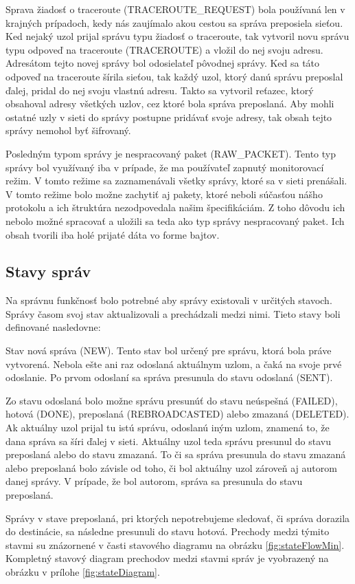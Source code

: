 \documentclass[slovak,master]{diploma}
\begin{document}
Sprava žiadosť o traceroute (TRACEROUTE\_REQUEST) bola používaná len v krajných prípadoch, kedy nás zaujímalo akou cestou sa správa preposiela sieťou. 
Ked nejaký uzol prijal správu typu žiadosť o traceroute, tak vytvoril novu správu typu odpoveď na traceroute (TRACEROUTE) a vložil do nej svoju adresu. 
Adresátom tejto novej správy bol odosielateľ pôvodnej správy. Ked sa táto odpoveď na traceroute šírila sieťou, 
tak každý uzol, ktorý danú správu preposlal ďalej, pridal do nej svoju vlastnú adresu.
Takto sa vytvoril reťazec, ktorý obsahoval adresy všetkých uzlov, cez ktoré bola správa preposlaná.
Aby mohli ostatné uzly v sieti do správy postupne pridávať svoje adresy, tak obsah tejto správy nemohol byť šifrovaný.

Posledným typom správy je nespracovaný paket (RAW\_PACKET). Tento typ správy bol využívaný iba v prípade, že ma používateľ zapnutý monitorovací režim.
V tomto režime sa zaznamenávali všetky správy, ktoré sa v sieti prenášali. V tomto režime bolo možne zachytiť aj pakety, 
ktoré neboli súčasťou nášho protokolu a ich štruktúra nezodpovedala našim špecifikáciám. Z toho dôvodu ich nebolo možné spracovať a 
uložili sa teda ako typ správy nespracovaný paket. Ich obsah tvorili iba holé prijaté dáta vo forme bajtov.

\subsection{Stavy správ}
Na správnu funkčnosť bolo potrebné aby správy existovali v určitých stavoch. Správy časom svoj stav aktualizovali a prechádzali medzi nimi. 
Tieto stavy boli definované nasledovne:

Stav nová správa (NEW). Tento stav bol určený pre správu, ktorá bola práve vytvorená. Nebola ešte ani raz odoslaná aktuálnym uzlom, a čaká na svoje 
prvé odoslanie. Po prvom odoslaní sa správa presunula do stavu odoslaná (SENT).

Zo stavu odoslaná bolo možne správu presunúť do stavu neúspešná (FAILED), hotová (DONE), preposlaná (REBROADCASTED) alebo zmazaná (DELETED). 
Ak aktuálny uzol prijal tu istú správu, odoslanú iným uzlom, znamená to, že dana správa sa šíri ďalej v sieti. Aktuálny uzol teda správu 
presunul do stavu preposlaná alebo do stavu zmazaná. 
To či sa správa presunula do stavu zmazaná alebo preposlaná bolo závisle od toho, či bol aktuálny uzol zároveň aj autorom danej správy. V prípade, že bol autorom, 
správa sa presunula do stavu preposlaná.

Správy v stave preposlaná, pri ktorých nepotrebujeme sledovať, či správa dorazila do destinácie, sa následne presunuli do stavu hotová. Prechody medzi týmito stavmi 
su znázornené v časti stavového diagramu na obrázku \ref{fig:stateFlowMin}. Kompletný stavový diagram prechodov medzi stavmi správ je vyobrazený na obrázku v prílohe \ref{fig:stateDiagram}.
\end{document}
